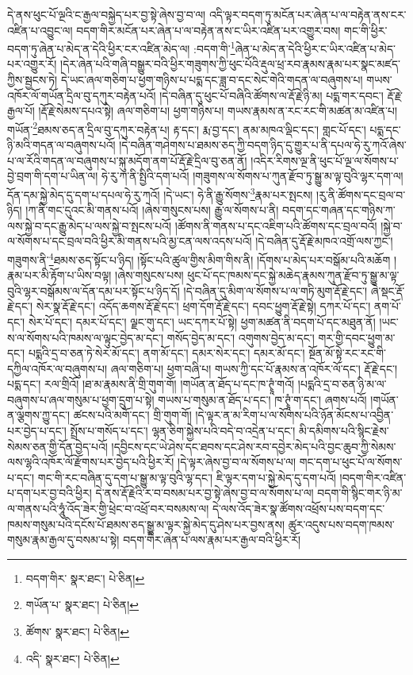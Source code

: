 དེ་ནས་ཕུང་པོ་ལྔའི་ང་རྒྱལ་བསྐྱེད་པར་བྱ་སྟེ་ཞེས་བྱ་བ་ལ། འདི་ལྟར་བདག་ཏུ་མངོན་པར་ཞེན་པ་ལ་བརྟེན་ནས་ངར་འཛིན་པ་འབྱུང་ལ། བདག་གིར་མངོན་པར་ཞེན་པ་ལ་བརྟེན་ནས་ང་ཡིར་འཛིན་པར་འགྱུར་བས། གང་གི་ཕྱིར་བདག་ཏུ་ཞེན་པ་མེད་ན་དེའི་ཕྱིར་ངར་འཛིན་མེད་ལ། :བདག་གི་\footnote{བདག་གིར་  སྣར་ཐང་།  པེ་ཅིན། }ཞེན་པ་མེད་ན་དེའི་ཕྱིར་ང་ཡིར་འཛིན་པ་མེད་པར་འགྱུར་རོ། །དེར་ཞེན་པའི་གཞི་བསྒྱུར་བའི་ཕྱིར་གཟུགས་ཀྱི་ཕུང་པོའི་རྡུལ་ཕྲ་རབ་རྣམས་རྣམ་པར་སྣང་མཛད་ཀྱིས་སྦྱངས་ཏེ། དེ་ཡང་ཞལ་གཅིག་པ་ཕྱག་གཉིས་པ་པདྨ་དང་ཟླ་བ་དང་སེང་གེའི་གདན་ལ་བཞུགས་པ། གཡས་འཁོར་ལོ་གཡོན་དྲིལ་བུ་དཀུར་བརྟེན་པའོ། །དེ་བཞིན་དུ་ཕུང་པོ་བཞིའི་ཚོགས་ལ་རྡོ་རྗེ་ཉི་མ། པདྨ་གར་དབང་། རྡོ་རྗེ་རྒྱལ་པོ། །རྡོ་རྗེ་སེམས་དཔའ་སྟེ། ཞལ་གཅིག་པ། ཕྱག་གཉིས་པ། གཡས་རྣམས་ན་རང་རང་གི་མཚན་མ་འཛིན་པ། གཡོན་\footnote{གཡོན་པ་  སྣར་ཐང་།  པེ་ཅིན། }ཐམས་ཅད་ན་དྲིལ་བུ་དཀུར་བརྟེན་པ། རྟ་དང་། རྨ་བྱ་དང་། ནམ་མཁའ་ལྡིང་དང་། གླང་པོ་དང་། པདྨ་དང་ཉི་མའི་གདན་ལ་བཞུགས་པའོ། །དེ་བཞིན་གཤེགས་པ་ཐམས་ཅད་ཀྱི་བདག་ཉིད་དུ་གྱུར་པ་ནི་དཔལ་ཧེ་རུ་ཀའོ་ཞེས་པ་ལ་རོའི་གདན་ལ་བཞུགས་པ་སྐུ་མདོག་ནག་པོ་རྡོ་རྗེ་དྲིལ་བུ་ཅན་ནོ། །འདིར་རིགས་ལྔ་ནི་ཕུང་པོ་ལྔ་ལ་སོགས་པ་བྱེ་བྲག་གི་དག་པ་ཡིན་ལ། ཧེ་རུ་ཀ་ནི་སྤྱིའི་དག་པའོ། །གཟུགས་ལ་སོགས་པ་ཀུན་རྫོབ་ཏུ་སྒྱུ་མ་ལྟ་བུའི་ལྷར་དག་ལ། དོན་དམ་སྐྱེ་མེད་དུ་དག་པ་དཔལ་ཧེ་རུ་ཀའོ། །དེ་ཡང་། ཧེ་ནི་རྒྱུ་སོགས་\footnote{ཚོགས་  སྣར་ཐང་།  པེ་ཅིན། }རྣམ་པར་སྤངས། །རུ་ནི་ཚོགས་དང་བྲལ་བ་ཉིད། །ཀ་ནི་གང་དུའང་མི་གནས་པའོ། །ཞེས་གསུངས་པས། རྒྱུ་ལ་སོགས་པ་ནི། བདག་དང་གཞན་དང་གཉིས་ཀ་ལས་སྐྱེ་བ་དང་རྒྱུ་མེད་པ་ལས་སྐྱེ་བ་སྤངས་པའོ། །ཚོགས་ནི་གནས་པ་དང་འཇིག་པའི་ཚོགས་དང་བྲལ་བའོ། །སྐྱེ་བ་ལ་སོགས་པ་དང་བྲལ་བའི་ཕྱིར་མི་གནས་པའི་མྱ་ངན་ལས་འདས་པའོ། །དེ་བཞིན་དུ་རྡོ་རྗེ་མཁའ་འགྲོ་ལས་ཀྱང་། གཟུགས་ནི་\footnote{འདི་  སྣར་ཐང་།  པེ་ཅིན། }ཐམས་ཅད་སྟོང་པ་ཉིད། །སྟོང་པའི་ཚུལ་གྱིས་མིག་གིས་ནི། །དོགས་པ་མེད་པར་བསྒོམ་པའི་མཆོག །རྣམ་པར་མི་རྟོག་པ་ཡིས་བལྟ། །ཞེས་གསུངས་པས། ཕུང་པོ་དང་ཁམས་དང་སྐྱེ་མཆེད་རྣམས་ཀུན་རྫོབ་ཏུ་སྒྱུ་མ་ལྟ་བུའི་ལྷར་བསྒོམས་ལ་དོན་དམ་པར་སྟོང་པ་ཉིད་དོ། །དེ་བཞིན་དུ་མིག་ལ་སོགས་པ་ལ་གཏི་མུག་རྡོ་རྗེ་དང་། ཞེ་སྡང་རྡོ་རྗེ་དང་། སེར་སྣ་རྡོ་རྗེ་དང་། འདོད་ཆགས་རྡོ་རྗེ་དང་། ཕྲག་དོག་རྡོ་རྗེ་དང་། དབང་ཕྱུག་རྡོ་རྗེ་སྟེ། དཀར་པོ་དང་། ནག་པོ་དང་། སེར་པོ་དང་། དམར་པོ་དང་། ལྗང་གུ་དང་། ཡང་དཀར་པོ་སྟེ། ཕྱག་མཚན་ནི་བདག་པོ་དང་མཐུན་ནོ། །ཡང་ས་ལ་སོགས་པའི་ཁམས་ལ་ལྟུང་བྱེད་མ་དང་། གསོད་བྱེད་མ་དང་། འགུགས་བྱེད་མ་དང་། གར་གྱི་དབང་ཕྱུག་མ་དང་། པདྨའི་དྲ་བ་ཅན་ཏེ་སེར་མོ་དང་། ནག་མོ་དང་། དམར་སེར་དང་། དམར་མོ་དང་། སྔོན་མོ་སྟེ་རང་རང་གི་དཀྱིལ་འཁོར་ལ་བཞུགས་པ། ཞལ་གཅིག་པ། ཕྱག་བཞི་པ། གཡས་ཀྱི་དང་པོ་རྣམས་ན་འཁོར་ལོ་དང་། རྡོ་རྗེ་དང་། པདྨ་དང་། རལ་གྲིའོ། །ཐ་མ་རྣམས་ནི་གྲི་གུག་གོ། །གཡོན་ན་ཐོད་པ་དང་ཁ་ཊྭཱཾ་གའོ། །པདྨའི་དྲ་བ་ཅན་ཉི་མ་ལ་བཞུགས་པ་ཞལ་གསུམ་པ་ཕྱག་དྲུག་པ་སྟེ། གཡས་པ་གསུམ་ན་ཐོད་པ་དང་། ཁ་ཊྭཱཾ་ག་དང་། ཞགས་པའོ། །གཡོན་ན་ལྕགས་ཀྱུ་དང་། ཚངས་པའི་མགོ་དང་། གྲི་གུག་གོ། །དེ་ལྟར་ན་མ་རིག་པ་ལ་སོགས་པའི་ཉོན་མོངས་པ་འབྱིན་པར་བྱེད་པ་དང་། སྤྲོས་པ་གསོད་པ་དང་། ལྷན་ཅིག་སྐྱེས་པའི་བདེ་བ་འདྲེན་པ་དང་། མི་དམིགས་པའི་སྙིང་རྗེས་སེམས་ཅན་གྱི་དོན་བྱེད་པའོ། །དབྱིངས་དང་ཡེ་ཤེས་དང་ཐབས་དང་ཤེས་རབ་དབྱེར་མེད་པའི་བྱང་ཆུབ་ཀྱི་སེམས་ལས་ལྷའི་འཁོར་ལོ་རྫོགས་པར་བྱེད་པའི་ཕྱིར་རོ། །དེ་ལྟར་ཞེས་བྱ་བ་ལ་སོགས་པ་ལ། གང་དག་པ་ཕུང་པོ་ལ་སོགས་པ་དང་། གང་གི་རང་བཞིན་དུ་དག་པ་སྒྱུ་མ་ལྟ་བུའི་ལྷ་དང་། ཇི་ལྟར་དག་པ་སྐྱེ་མེད་དུ་དག་པའོ། །བདག་གིར་འཛིན་པ་དག་པར་བྱ་བའི་ཕྱིར། དེ་ནས་རྡོ་རྗེའི་ར་བ་བསམ་པར་བྱ་སྟེ་ཞེས་བྱ་བ་ལ་སོགས་པ་ལ། བདག་གི་སྙིང་གར་ཉི་མ་ལ་གནས་པའི་ཧཱུཾ་འོད་ཟེར་གྱི་ཕྲེང་བ་འཕྲོ་བར་བསམས་ལ། དེ་ལས་འོད་ཟེར་སྣ་ཚོགས་འཕྲོས་པས་བདག་དང་ཁམས་གསུམ་པའི་དངོས་པོ་ཐམས་ཅད་སྒྱུ་མ་ལྟར་སྐྱེ་མེད་དུ་ཤེས་པར་བྱས་ནས། ཚུར་འདུས་པས་བདག་ཁམས་གསུམ་རྣམ་རྒྱལ་དུ་བསམ་པ་སྟེ། བདག་གིར་ཞེན་པ་ལས་རྣམ་པར་རྒྱལ་བའི་ཕྱིར་རོ། 